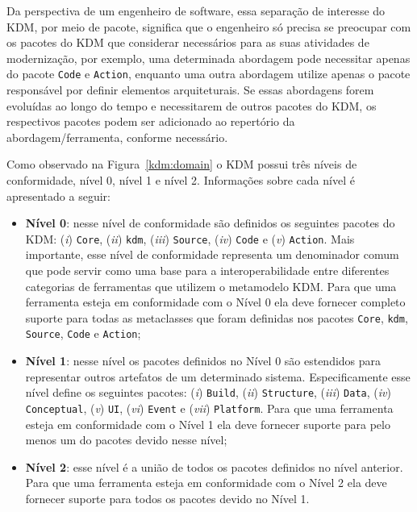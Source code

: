 Da perspectiva de um engenheiro de software, essa separação de interesse do KDM, por meio de pacote, significa que o engenheiro só precisa se preocupar com os pacotes do KDM que considerar necessários para as suas atividades de modernização, por exemplo, uma determinada abordagem pode necessitar apenas do pacote \texttt{Code} e \texttt{Action}, enquanto uma outra abordagem utilize apenas o pacote responsável por definir elementos arquiteturais. Se essas abordagens forem evoluídas ao longo do tempo e necessitarem de outros pacotes do KDM, os respectivos pacotes podem ser adicionado ao repertório da abordagem/ferramenta, conforme necessário.

Como observado na Figura~\ref{kdm:domain} o KDM possui três níveis de conformidade, nível 0, nível 1 e nível 2. Informações sobre cada nível é apresentado a seguir:

\begin{itemize}
    \item \textbf{Nível 0}: nesse nível de conformidade são definidos os seguintes pacotes do KDM: (\textit{i})     \texttt{Core}, (\textit{ii}) \texttt{kdm}, (\textit{iii}) \texttt{Source}, (\textit{iv}) \texttt{Code} e (\textit{v}) \texttt{Action}. Mais importante, esse nível de conformidade representa um denominador comum que pode servir como uma base para a interoperabilidade entre diferentes categorias de ferramentas que utilizem o metamodelo KDM. Para que uma ferramenta esteja em conformidade com o Nível 0 ela deve fornecer completo suporte para todas as metaclasses que foram definidas nos pacotes \texttt{Core}, \texttt{kdm}, \texttt{Source}, \texttt{Code} e \texttt{Action};
    \item \textbf{Nível 1}: nesse nível os pacotes definidos no Nível 0 são estendidos para representar outros artefatos de um determinado sistema. Especificamente esse nível define os seguintes pacotes: (\textit{i}) \texttt{Build}, (\textit{ii}) \texttt{Structure}, (\textit{iii}) \texttt{Data}, (\textit{iv}) \texttt{Conceptual}, (\textit{v}) \texttt{UI}, (\textit{vi}) \texttt{Event} e (\textit{vii}) \texttt{Platform}. Para que uma ferramenta esteja em conformidade com o Nível 1 ela deve fornecer suporte para pelo menos um do pacotes devido nesse nível;
    \item \textbf{Nível 2}: esse nível é a união de todos os pacotes definidos no nível anterior. Para que uma ferramenta esteja em conformidade com o Nível 2 ela deve fornecer suporte para todos os pacotes devido no Nível 1.
\end{itemize}


